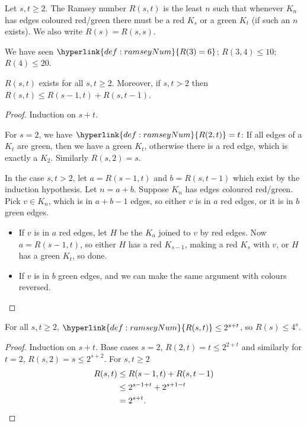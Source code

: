 \documentclass{article}
\newcommand{\red}[1]{\textcolor{bred}{#1}}
\newcommand{\green}[1]{\textcolor{bgreen}{#1}}
\begin{document}
\begin{defi}
    Let $s, t \geq 2$. The Ramsey number $R(s, t)$ is the least $n$ such that whenever \hyperlink{def:Kn}{$K_n$} has edges coloured \red{red}/\green{green} there must be a \red{red $K_s$} or a \green{green $K_t$} (if such an $n$ exists).
    We also write $R(s) = R(s, s)$.
\end{defi}

We have seen $\hyperlink{def:ramseyNum}{R(3) = 6}$; $R(3, 4) \leq 10$; $R(4) \leq 20$.

\begin{nthm}\label{thm:ramsey}
    \hyperlink{def:ramseyNum}{$R(s, t)$} exists for all $s, t \geq 2$.
    Moreover, if $s, t > 2$ then $R(s, t) \leq R(s-1, t) + R(s, t-1)$.
\end{nthm}

\begin{proof}
    Induction on $s+t$.

    For $s=2$, we have $\hyperlink{def:ramseyNum}{R(2, t)} = t$: If all edges of a $K_t$ are \green{green}, then we have a \green{green $K_t$}, otherwise there is a \red{red edge}, which is exactly a \red{$K_2$}.  Similarly $R(s, 2) = s$.

    In the case $s, t > 2$, let $a = R(s-1, t)$ and $b = R(s, t-1)$ which exist by the induction hypothesis.  Let $n = a+b$. Suppose $K_n$ has edges coloured \red{red}/\green{green}.
    Pick $v \in K_n$, which is in $a+b-1$ edges, so either $v$ is in \red{$a$ red edges}, or it is in \green{$b$ green edges}.
    \begin{itemize}
        \item If $v$ is in \red{$a$ red edges}, let $H$ be the $K_a$ joined to $v$ by \red{red} edges.  Now $a = R(s-1, t)$, so either $H$ has a \red{red $K_{s-1}$}, making a \red{red $K_s$} with $v$, or $H$ has a \green{green $K_t$}, so done.
        \item If $v$ is in \green{$b$ green edges}, and we can make the same argument with colours reversed. \qedhere
    \end{itemize}
\end{proof}

\begin{ncor}\label{cor:3}
    For all $s, t \geq 2$, $\hyperlink{def:ramseyNum}{R(s, t)} \leq 2^{s+t}$, so $R(s) \leq 4^s$.
\end{ncor}

\begin{proof}
    Induction on $s + t$.  Base cases $s=2$, $R(2, t) = t \leq 2^{2+t}$ and similarly for $t=2$, $R(s, 2) = s \leq 2^{s+2}$.
    For $s, t \geq 2$
    \begin{align*}
        R(s, t) &\leq R(s-1, t) + R(s, t-1) \\
                &\leq 2^{s-1+t} + 2^{s+1-t} \\
                &= 2^{s+t}. \qedhere
    \end{align*}
\end{proof}
\end{document}
